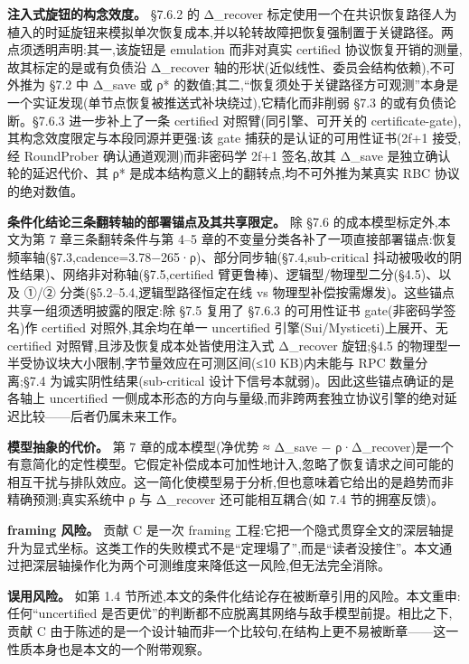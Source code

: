 \documentclass[UTF8,fontset=windows,a4paper,11pt]{ctexart}
\begin{document}
\textbf{注入式旋钮的构念效度。} §7.6.2 的 Δ\_recover
标定使用一个在共识恢复路径人为植入的时延旋钮来模拟单次恢复成本,并以轮转故障把恢复强制置于关键路径。两点须透明声明:其一,该旋钮是
emulation 而非对真实 certified 协议恢复开销的测量,故其标定的是或有负债沿
Δ\_recover 轴的形状(近似线性、委员会结构依赖),不可外推为 §7.2 中 Δ\_save
或 ρ*
的数值;其二,``恢复须处于关键路径方可观测''本身是一个实证发现(单节点恢复被推送式补块绕过),它精化而非削弱
§7.3 的或有负债论断。§7.6.3 进一步补上了一条 certified
对照臂(同引擎、可开关的
certificate-gate),其构念效度限定与本段同源并更强:该 gate
捕获的是认证的可用性证书(2f+1 接受,经 RoundProber
确认通道观测)而非密码学 2f+1 签名,故其 Δ\_save
是独立确认轮的延迟代价、其 ρ*
是成本结构意义上的翻转点,均不可外推为某真实 RBC 协议的绝对数值。

\textbf{条件化结论三条翻转轴的部署锚点及其共享限定。} 除 §7.6
的成本模型标定外,本文为第 7 章三条翻转条件与第 4--5
章的不变量分类各补了一项直接部署锚点:恢复频率轴(§7.3,cadence=3.78−265·ρ)、部分同步轴(§7.4,sub-critical
抖动被吸收的阴性结果)、网络非对称轴(§7.5,certified
臂更鲁棒)、逻辑型/物理型二分(§4.5)、以及 ①/②
分类(§5.2--5.4,逻辑型路径恒定在线 vs
物理型补偿按需爆发)。这些锚点共享一组须透明披露的限定:除 §7.5 复用了
§7.6.3 的可用性证书 gate(非密码学签名)作 certified 对照外,其余均在单一
uncertified 引擎(Sui/Mysticeti)上展开、无 certified
对照臂,且涉及恢复成本处皆使用注入式 Δ\_recover 旋钮;§4.5
的物理型一半受协议块大小限制,字节量效应在可测区间(≤10 KB)内未能与 RPC
数量分离;§7.4 为诚实阴性结果(sub-critical
设计下信号本就弱)。因此这些锚点确证的是各轴上 uncertified
一侧成本形态的方向与量级,而非跨两套独立协议引擎的绝对延迟比较------后者仍属未来工作。

\textbf{模型抽象的代价。} 第 7 章的成本模型(净优势 ≈ Δ\_save −
ρ·Δ\_recover)是一个有意简化的定性模型。它假定补偿成本可加性地计入,忽略了恢复请求之间可能的相互干扰与排队效应。这一简化使模型易于分析,但也意味着它给出的是趋势而非精确预测;真实系统中
ρ 与 Δ\_recover 还可能相互耦合(如 7.4 节的拥塞反馈)。

\textbf{framing 风险。} 贡献 C 是一次 framing
工程:它把一个隐式贯穿全文的深层轴提升为显式坐标。这类工作的失败模式不是``定理塌了'',而是``读者没接住''。本文通过把深层轴操作化为两个可测维度来降低这一风险,但无法完全消除。

\textbf{误用风险。} 如第 1.4
节所述,本文的条件化结论存在被断章引用的风险。本文重申:任何``uncertified
是否更优''的判断都不应脱离其网络与敌手模型前提。相比之下,贡献 C
由于陈述的是一个设计轴而非一个比较句,在结构上更不易被断章------这一性质本身也是本文的一个附带观察。
\end{document}
